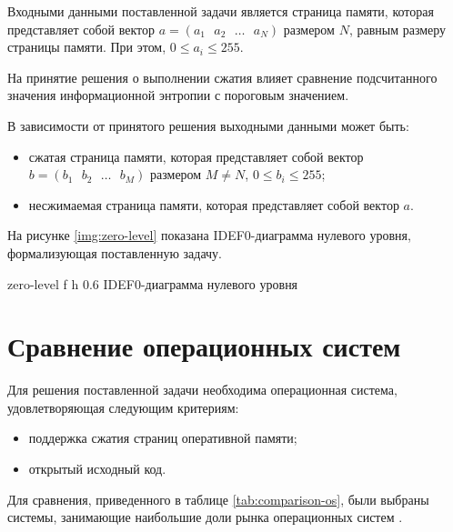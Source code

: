 Входными данными поставленной задачи является страница памяти, которая представляет собой вектор $a = (a_1\text{ }a_2\text{ }\dotso\text{ }a_N)$ размером $N$, равным размеру страницы памяти. При этом, $0 \leq a_i \leq 255$.

На принятие решения о выполнении сжатия влияет сравнение подсчитанного значения информационной энтропии с пороговым значением.

В зависимости от принятого решения выходными данными может быть:
\begin{itemize}
	\item сжатая страница памяти, которая представляет собой вектор $b = (b_1\text{ }b_2\text{ }\dotso\text{ }b_M)$ размером $M \neq N$, $0 \leq b_i \leq 255$;
    \item несжимаемая страница памяти, которая представляет собой вектор $a$.
\end{itemize}

На рисунке \ref{img:zero-level} показана IDEF0-диаграмма нулевого уровня, формализующая поставленную задачу.

    {zero-level}
    {f}
    {h}
    {0.6\textwidth}
    {IDEF0-диаграмма нулевого уровня}

\section{Сравнение операционных систем}

Для решения поставленной задачи необходима операционная система, удовлетворяющая следующим критериям:

\begin{itemize}
	\item поддержка сжатия страниц оперативной памяти;
	\item открытый исходный код.
\end{itemize}

Для сравнения, приведенного в таблице \ref{tab:comparison-os}, были выбраны системы, занимающие наибольшие доли рынка операционных систем \cite{stat}.

